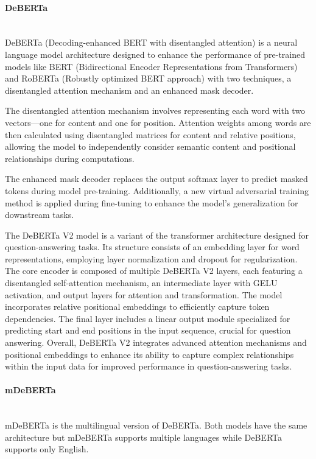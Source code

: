\documentclass[12pt,oneside,openright,a4paper]{cpe-english-project}
\begin{document}
        \paragraph{DeBERTa}\mbox{}\\
          \null\qquad DeBERTa (Decoding-enhanced BERT with disentangled attention) is a neural language model architecture designed to enhance the performance of pre-trained models like BERT (Bidirectional Encoder Representations from Transformers) and RoBERTa (Robustly optimized BERT approach) with two techniques, a disentangled attention mechanism and an enhanced mask decoder.\par
          \qquad The disentangled attention mechanism involves representing each word with two vectors—one for content and one for position. Attention weights among words are then calculated using disentangled matrices for content and relative positions, allowing the model to independently consider semantic content and positional relationships during computations.\par
          \qquad The enhanced mask decoder replaces the output softmax layer to predict masked tokens during model pre-training. Additionally, a new virtual adversarial training method is applied during fine-tuning to enhance the model's generalization for downstream tasks.\par
          \qquad The DeBERTa V2 model is a variant of the transformer architecture designed for question-answering tasks. Its structure consists of an embedding layer for word representations, employing layer normalization and dropout for regularization. The core encoder is composed of multiple DeBERTa V2 layers, each featuring a disentangled self-attention mechanism, an intermediate layer with GELU activation, and output layers for attention and transformation. The model incorporates relative positional embeddings to efficiently capture token dependencies. The final layer includes a linear output module specialized for predicting start and end positions in the input sequence, crucial for question answering. Overall, DeBERTa V2 integrates advanced attention mechanisms and positional embeddings to enhance its ability to capture complex relationships within the input data for improved performance in question-answering tasks.\par
  
        \paragraph{mDeBERTa}\mbox{}\\
          \null\qquad mDeBERTa is the multilingual version of DeBERTa. Both models have the same architecture but mDeBERTa supports multiple languages while DeBERTa supports only English.\par
      
\end{document}
